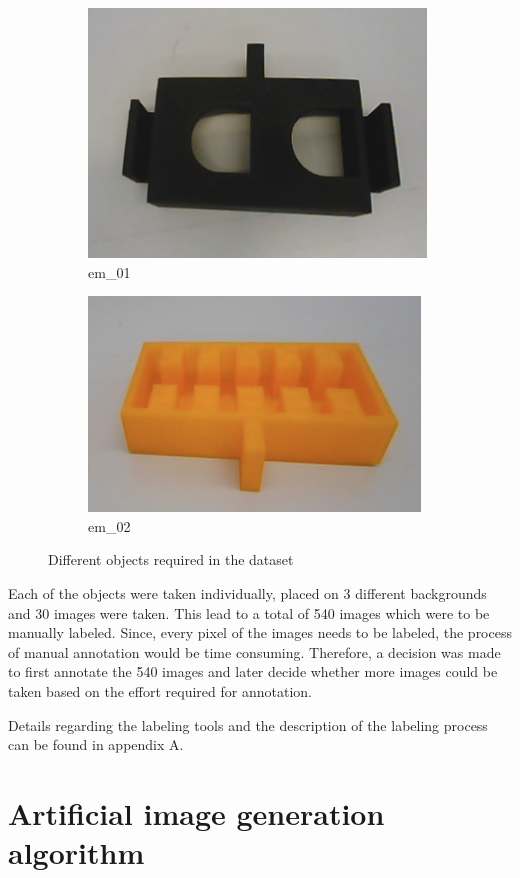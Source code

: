 \begin{figure}
		\begin{subfigure}{.3\textwidth}
  			\centering
  			\includegraphics[width=.5\linewidth]{images/em_01}
  			\caption{em\_01}
  			\label{fig:em_01}
		\end{subfigure}
		\begin{subfigure}{.3\textwidth}
  			\centering
  			\includegraphics[width=.5\linewidth]{images/em_02}
  			\caption{em\_02}
  			\label{fig:em_02}
		\end{subfigure}
		\caption{Different objects required in the dataset}
		\label{Fig:objects}
	\end{figure}

Each of the objects were taken individually, placed on 3 different backgrounds and 30 images were taken. This lead to a total of 540 images which were to be manually labeled. Since, every pixel of the images needs to be labeled, the process of manual annotation would be time consuming. Therefore, a decision was made to first annotate the 540 images and later decide whether more images could be taken based on the effort required for annotation.

Details regarding the labeling tools and the description of the labeling process can be found in appendix A. 

\section{Artificial image generation algorithm}

